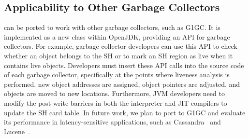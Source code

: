 \subsection{Applicability to Other Garbage Collectors}
\teraheapName{} can be ported to work with other garbage collectors, such as G1GC. It is
implemented as a new class within OpenJDK, providing an API for garbage
collectors. For example, garbage collector developers can use this API to check
whether an object belongs to the SH or to mark an SH region as live when it
contains live objects. Developers must insert these API calls into the source
code of each garbage collector, specifically at the points where liveness
analysis is performed, new object addresses are assigned, object pointers are
adjusted, and objects are moved to new locations. Furthermore, JVM developers
need to modify the post-write barriers in both the interpreter and JIT compilers
to update the SH card table. In future work, we plan to port \teraheapName{} to G1GC and
evaluate its performance in latency-sensitive applications, such as
Cassandra~\cite{teraheap:cassandra} and Lucene~\cite{lucene}.
